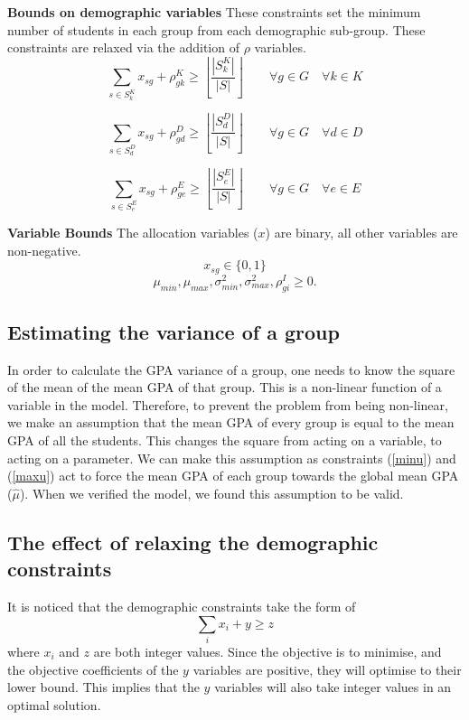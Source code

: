 \documentclass[12pt]{ORSNZ}
\begin{document}
\begin{description}
\textbf{Bounds on demographic variables} These constraints set the minimum number of students in each group from each demographic sub-group. These constraints are relaxed via the addition of $\rho$ variables.
\begin{equation} \label{con3}
\sum_{s \in S^K_k} x_{sg} + \rho^K_{gk} \geq \left\lfloor\frac{|S^K_k|}{|S|}\right\rfloor \qquad \mbox{$\forall g \in G \quad \forall k \in K$}
\end{equation}

\begin{equation} \label{con4}
\sum_{s \in S^D_d} x_{sg} + \rho^D_{gd}  \geq \left\lfloor\frac{|S^D_d|}{|S|}\right\rfloor \qquad \mbox{$\forall g \in G \quad \forall d \in D$}
\end{equation}

\begin{equation} \label{con5}
\sum_{s \in S^E_e} x_{sg} + \rho^E_{ge}  \geq \left\lfloor\frac{|S^E_e|}{|S|}\right\rfloor \qquad \mbox{$\forall g \in G \quad \forall e \in E$}
\end{equation}

\textbf{Variable Bounds} The allocation variables ($x$) are binary, all other variables are non-negative.
\[x_{sg} \in \{0, 1\}\]
\[\mu_{min}, \mu_{max}, \sigma^2_{min}, \sigma^2_{max}, \rho^I_{gi}  \ge 0.\]

\end{description}
\subsection{Estimating the variance of a group}
In order to calculate the GPA variance of a group, one needs to know the square of the mean of the mean GPA of that group. This is a non-linear function of a variable in the model. Therefore, to prevent the problem from being non-linear, we make an assumption that the mean GPA of every group is equal to the mean GPA of all the students. This changes the square from acting on a variable, to acting on a parameter. We can make this assumption as constraints (\ref{minu}) and (\ref{maxu}) act to force the mean GPA of each group towards the global mean GPA ($\hat{\mu}$). When we verified the model, we found this assumption to be valid.

\subsection{The effect of relaxing the demographic constraints}
It is noticed that the demographic constraints take the form of 
\begin{equation}
\sum_i x_i + y \geq z
\end{equation}
where $x_i$ and $z$ are both integer values. Since the objective is to minimise, and the objective coefficients of the $y$ variables are positive, they will optimise to their lower bound. This implies that the $y$ variables will also take integer values in an optimal solution. 
\end{document}
